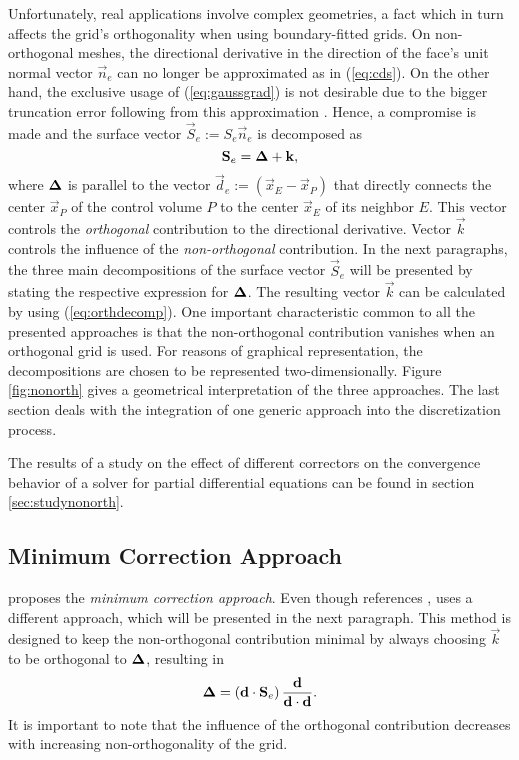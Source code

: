 Unfortunately, real applications involve complex geometries, a fact which in turn affects the grid's orthogonality when using boundary-fitted grids. On non-orthogonal meshes, the directional derivative in the direction of the face's unit normal vector \(\vec{n}_e\) can no longer be approximated as in (\ref{eq:cds}). On the other hand, the exclusive usage of (\ref{eq:gaussgrad}) is not desirable due to the bigger truncation error following from this approximation \cite{jasak96}. Hence, a compromise is made and the surface vector \(\vec{S}_e := S_e \vec{n}_e\) is decomposed as
\begin{equation}
  \label{eq:orthdecomp}
  \mathbf{S}_e = \boldsymbol{\Delta} + \mathbf{k},
\end{equation}
where \(\boldsymbol{\Delta}\) is parallel to the vector \(\vec{d}_e := \left(\vec{x}_E - \vec{x}_P\right)\) that directly connects the center \(\vec{x}_P\) of the control volume \(P\) to the center \(\vec{x}_E\) of its neighbor \(E\). This vector controls the \emph{orthogonal} contribution to the directional derivative. Vector \(\vec{k}\) controls the influence of the \emph{non-orthogonal} contribution. In the next paragraphs, the three main decompositions of the surface vector \(\vec{S}_e\) will be presented by stating the respective expression for \(\boldsymbol{\Delta}\). The resulting vector \(\vec{k}\) can be calculated by using (\ref{eq:orthdecomp}). One important characteristic common to all the presented approaches is that the non-orthogonal contribution vanishes when an orthogonal grid is used. For reasons of graphical representation, the decompositions are chosen to be represented two-dimensionally. Figure \ref{fig:nonorth} gives a geometrical interpretation of the three approaches. The last section deals with the integration of one generic approach into the discretization process. 

The results of a study on the effect of different correctors on the convergence behavior of a solver for partial differential equations can be found in section \ref{sec:studynonorth}.

\subsection{Minimum Correction Approach}

\cite{muzaferja} proposes the \emph{minimum correction approach}. Even though \cite{ferziger02} references \cite{muzaferja}, \cite{ferziger02} uses a different approach, which will be presented in the next paragraph. This method is designed to keep the non-orthogonal contribution minimal by always choosing \(\vec{k}\) to be orthogonal to \(\boldsymbol{\Delta}\), resulting in
\begin{displaymath}
  \boldsymbol{\Delta} = \left( \mathbf{d} \cdot \mathbf{S}_e \right) \frac{\mathbf{d}}{\mathbf{d} \cdot \mathbf{d}}.
\end{displaymath}
It is important to note that the influence of the orthogonal contribution decreases with increasing non-orthogonality of the grid.

